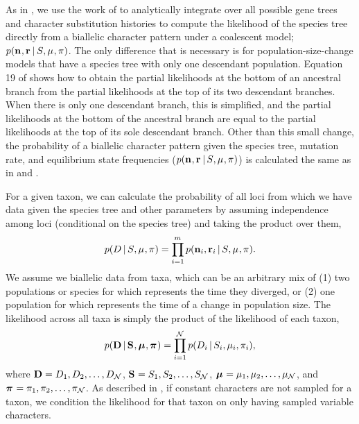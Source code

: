 As in \citet{Oaks2018ecoevolity},
we use the work of \citet{Bryant2012}
to analytically integrate over all possible gene trees and
character substitution histories to compute the likelihood
of the species tree directly from 
a biallelic character pattern under a coalescent model;
$\pr(\leafallelecounts, \leafredallelecounts \given \sptree, \murate, \gfreq)$.
The only difference that is necessary is for population-size-change models that
have a species tree with only one descendant population.
Equation 19 of \citet{Bryant2012} shows how to obtain the partial likelihoods
at the bottom of an ancestral branch from the partial likelihoods at the top of
its two descendant branches.
When there is only one descendant branch, this is simplified, and the partial
likelihoods at the bottom of the ancestral branch are equal to the partial
likelihoods at the top of its sole descendant branch.
Other than this small change, the probability of a biallelic character pattern
given the species tree, mutation rate, and equilibrium state frequencies
($\pr(\leafallelecounts, \leafredallelecounts \given \sptree, \murate, \gfreq)$)
is calculated the same as in \citet{Bryant2012} and \citet{Oaks2018ecoevolity}.


\begin{linenomath}
For a given taxon, we can calculate the probability of all \nloci{} loci
from which we have data given the species tree and other parameters by
assuming independence among loci (conditional on the species tree) and
taking the product over them,
\begin{equation}
    \pr(\comparisondata \given \sptree, \murate, \gfreq)
    =
    \prod_{i=1}^{\nloci}
    \pr(\leafallelecounts[i], \leafredallelecounts[i] \given \sptree, \murate, \gfreq).
    \label{eq:comparisonlikelihood}
\end{equation}
We assume we biallelic data from \ncomparisons{} taxa, which can be an
arbitrary mix of
(1) two populations or species for which \comparisonetime represents
the time they diverged, or
(2) one population for which \comparisonetime represents the time
of a change in population size.
The likelihood across all \ncomparisons{} taxa is simply the product of the
likelihood of each taxon,
\begin{equation}
    \pr(
    \alldata
    \given
    \sptrees,
    \murates,
    \gfreqs)
    =
    \prod_{i=1}^{\ncomparisons}
    \pr(\comparisondata[i] \given \sptree[i], \murate[i], \gfreq[i]),
    \label{eq:collectionlikelihood}
\end{equation}
where
$\alldata = \comparisondata[1], \comparisondata[2], \ldots, \comparisondata[\ncomparisons]$,
$\sptrees = \sptree[1], \sptree[2], \ldots, \sptree[\ncomparisons]$,
$\murates = \murate[1], \murate[2], \ldots, \murate[\ncomparisons]$,
and
$\gfreqs = \gfreq[1], \gfreq[2], \ldots, \gfreq[\ncomparisons]$.
As described in \citet{Oaks2018ecoevolity},
if constant characters are not sampled for a taxon, we condition the likelihood
for that taxon on only having sampled variable characters.
\end{linenomath}


